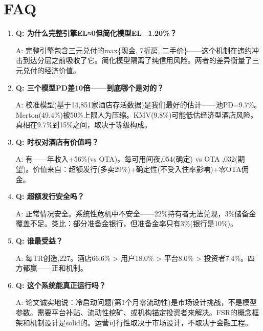 \documentclass[12pt,a4paper]{ctexart}
\begin{document}
\newpage

\section{FAQ}

\begin{enumerate}
    \item \textbf{Q: 为什么完整引擎EL≈0但简化模型EL=1.20\%？}

    A: 完整引擎包含三元兑付的max\{现金, 7折房, 二手价\}——这个机制在违约冲击到达分层之前吸收了它。简化模型隔离了纯信用风险。两者的差异衡量了三元兑付的经济价值。

    \item \textbf{Q: 三个模型PD差10倍——到底哪个是对的？}

    A: 校准模型(基于14,851家酒店存活数据)是我们最好的估计——池PD=9.7\%。Merton(49.4\%)被50\%上限人为压缩。KMV(9.8\%)可能低估经济型酒店风险。真相在9.7\%到15\%之间，取决于等级构成。

    \item \textbf{Q: 时权对酒店有价值吗？}

    A: 有——年收入+56\%(vs OTA)。每可用间夜,054(确定) vs OTA ,032(期望)。价值来自：超额发行(多卖29\%)+确定性(不受入住率影响)+零OTA佣金。

    \item \textbf{Q: 超额发行安全吗？}

    A: 正常情况安全。系统性危机中不安全——22\%持有者无法兑现，3\%储备金覆盖不足。类比：部分准备金银行，但准备金率只有3\%(银行是10\%)。

    \item \textbf{Q: 谁最受益？}

    A: 每TR创造,227。酒店66.6\% > 用户18.0\% > 平台8.0\% > 投资者7.4\%。四方都赢——正和机制。

    \item \textbf{Q: 这个系统能真正运行吗？}

    A: 论文诚实地说：冷启动问题(第1个月零流动性)是市场设计挑战，不是模型参数。需要平台补贴、流动性挖矿、或机构锚定投资者来解决。FSR的概念框架和机制设计是solid的。运营可行性取决于市场设计，不取决于金融工程。
\end{enumerate}

\newpage
\end{document}
